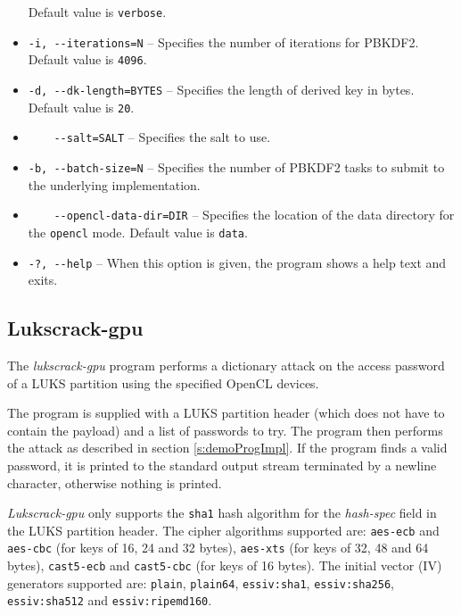 \documentclass[12pt,oneside]{fithesis2}
\begin{document}
\begin{itemize}
\begin{itemize}
        \end{itemize}
        Default value is \verb|verbose|.
        \item \verb|-i, --iterations=N| -- Specifies the number of iterations for PBKDF2. Default value is \verb|4096|.
        \item \verb|-d, --dk-length=BYTES| -- Specifies the length of derived key in bytes. Default value is \verb|20|.
        \item \verb|    --salt=SALT| -- Specifies the salt to use.
        \item \verb|-b, --batch-size=N| -- Specifies the number of PBKDF2 tasks to submit to the underlying implementation.
        \item \verb|    --opencl-data-dir=DIR| -- Specifies the location of the data directory for the \verb|opencl| mode. Default value is \verb|data|.
        \item \verb|-?, --help| -- When this option is given, the program shows a help text and exits.
      \end{itemize}
      
      \subsection{Lukscrack-gpu}
      The \emph{lukscrack-gpu} program performs a dictionary attack on the access password of a LUKS partition using the specified OpenCL devices.
      
      The program is supplied with a LUKS partition header (which does not have to contain the payload) and a list of passwords to try. The program then performs the attack as described in section \ref{s:demoProgImpl}. If the program finds a valid password, it is printed to the standard output stream terminated by a newline character, otherwise nothing is printed.
      
      \emph{Lukscrack-gpu} only supports the \verb|sha1| hash algorithm for the \emph{hash-spec} field in the LUKS partition header. The cipher algorithms supported are: \verb|aes-ecb| and \verb|aes-cbc| (for keys of 16, 24 and 32 bytes), \verb|aes-xts| (for keys of 32, 48 and 64 bytes), \verb|cast5-ecb| and \verb|cast5-cbc| (for keys of 16 bytes). The initial vector (IV) generators supported are: \verb|plain|, \verb|plain64|, \verb|essiv:sha1|, \verb|essiv:sha256|, \verb|essiv:sha512| and \verb|essiv:ripemd160|.
      
\end{document}
